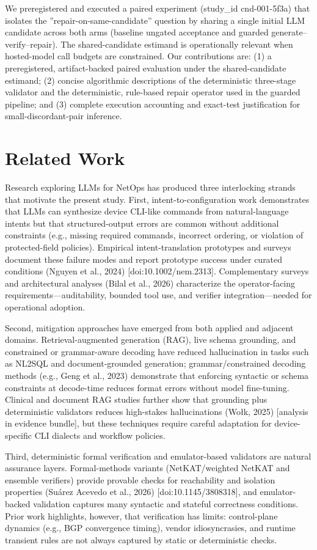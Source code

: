 \documentclass[conference]{IEEEtran}
\begin{document}
We preregistered and executed a paired experiment (study\_id cnd-001-5f3a) that isolates the ''repair-on-same-candidate'' question by sharing a single initial LLM candidate across both arms (baseline ungated acceptance and guarded generate--verify--repair). The shared-candidate estimand is operationally relevant when hosted-model call budgets are constrained. Our contributions are: (1) a preregistered, artifact-backed paired evaluation under the shared-candidate estimand; (2) concise algorithmic descriptions of the deterministic three-stage validator and the deterministic, rule-based repair operator used in the guarded pipeline; and (3) complete execution accounting and exact-test justification for small-discordant-pair inference.

\section{Related Work}
Research exploring LLMs for NetOps has produced three interlocking strands that motivate the present study. First, intent-to-configuration work demonstrates that LLMs can synthesize device CLI-like commands from natural-language intents but that structured-output errors are common without additional constraints (e.g., missing required commands, incorrect ordering, or violation of protected-field policies). Empirical intent-translation prototypes and surveys document these failure modes and report prototype success under curated conditions (Nguyen et al., 2024) [doi:10.1002/nem.2313]. Complementary surveys and architectural analyses (Bilal et al., 2026) characterize the operator-facing requirements---auditability, bounded tool use, and verifier integration---needed for operational adoption.

Second, mitigation approaches have emerged from both applied and adjacent domains. Retrieval-augmented generation (RAG), live schema grounding, and constrained or grammar-aware decoding have reduced hallucination in tasks such as NL2SQL and document-grounded generation; grammar/constrained decoding methods (e.g., Geng et al., 2023) demonstrate that enforcing syntactic or schema constraints at decode-time reduces format errors without model fine-tuning. Clinical and document RAG studies further show that grounding plus deterministic validators reduces high-stakes hallucinations (Wołk, 2025) [analysis in evidence bundle], but these techniques require careful adaptation for device-specific CLI dialects and workflow policies.

Third, deterministic formal verification and emulator-based validators are natural assurance layers. Formal-methods variants (NetKAT/weighted NetKAT and ensemble verifiers) provide provable checks for reachability and isolation properties (Suárez Acevedo et al., 2026) [doi:10.1145/3808318], and emulator-backed validation captures many syntactic and stateful correctness conditions. Prior work highlights, however, that verification has limits: control-plane dynamics (e.g., BGP convergence timing), vendor idiosyncrasies, and runtime transient rules are not always captured by static or deterministic checks.
\end{document}
